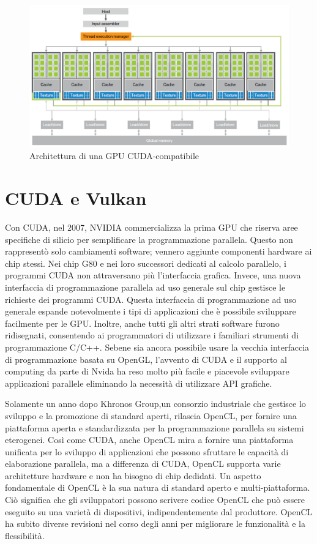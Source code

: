\begin{figure}[ht]
    \centering
    \includegraphics[width=.9\linewidth]{images/chapter2/cuda_arch.png}
    \caption{Architettura di una GPU CUDA-compatibile}
    \label{fig:cuda_arch}
\end{figure}


\section[CUDA e Vulkan]{CUDA e Vulkan}


Con CUDA, nel 2007, NVIDIA commercializza la prima GPU che  riserva aree specifiche di silicio per semplificare la programmazione parallela. Questo non rappresentò solo cambiamenti software; vennero aggiunte componenti hardware ai chip stessi. Nei chip G80 e nei loro successori dedicati al calcolo parallelo, i programmi CUDA non attraversano più l'interfaccia grafica. Invece, una nuova interfaccia di programmazione parallela ad uso generale sul chip gestisce le richieste dei programmi CUDA. Questa interfaccia di programmazione ad uso generale espande notevolmente i tipi di applicazioni che è possibile sviluppare facilmente per le GPU. Inoltre, anche tutti gli altri strati software furono ridisegnati, consentendo ai programmatori di utilizzare i familiari strumenti di programmazione C/C++. Sebene sia ancora possibile usare la vecchia interfaccia di programmazione basata su OpenGL, l'avvento di CUDA e il supporto al computing da parte di Nvida ha reso molto più facile e piacevole sviluppare applicazioni parallele eliminando la necessità di utilizzare API grafiche.


Solamente un anno dopo Khronos Group,un consorzio industriale che gestisce lo sviluppo e la promozione di standard aperti, rilascia OpenCL, per fornire una piattaforma aperta e standardizzata per la programmazione parallela su sistemi eterogenei. Così come CUDA, anche OpenCL mira a fornire una piattaforma unificata per lo sviluppo di applicazioni che possono sfruttare le capacità di elaborazione parallela, ma a differenza di CUDA, OpenCL supporta varie architetture hardware e non ha bisogno di chip dedidati. Un aspetto fondamentale di OpenCL è la sua natura di standard aperto e multi-piattaforma. Ciò significa che gli sviluppatori possono scrivere codice OpenCL che può essere eseguito su una varietà di dispositivi, indipendentemente dal produttore. OpenCL ha subito diverse revisioni nel corso degli anni per migliorare le funzionalità e la flessibilità. 